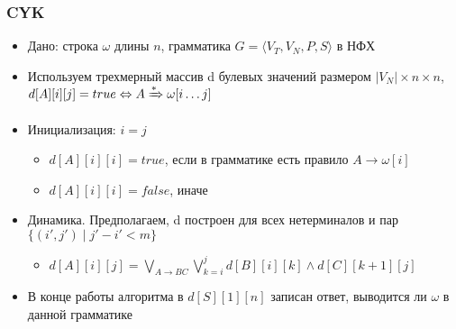 \documentclass{beamer}
\newcommand{\derives}[1][*]{\xRightarrow[]{#1}}
\begin{document}
\begin{frame}[fragile]
  \transwipe[direction=90]
  \frametitle{CYK}
  \begin{itemize}
      \item Дано: строка $\omega$ длины $n$, грамматика $G = \langle V_T, V_N, P, S\rangle$ в НФХ
      \item Используем трехмерный массив d булевых значений размером $|V_N| \times n \times n$, $d[A][i][j] = true \Leftrightarrow A \derives \omega[i \dots j]$
      \item Инициализация: $i = j$
      \begin{itemize}
        \item $d[A][i][i] = true$, если в грамматике есть правило $A \to \omega[i]$
        \item $d[A][i][i] = false$, иначе
      \end{itemize}
      \item Динамика. Предполагаем, d построен для всех нетерминалов и пар $\{(i', j') \mid j' - i' < m \}$
      \begin{itemize}
        \item $d[A][i][j] = \bigvee_{A\to BC}^{}{\bigvee_{k=i}^{j}{d[B][i][k] \wedge d[C][k+1][j]}}$
      \end{itemize}
      \item В конце работы алгоритма в $d[S][1][n]$ записан ответ, выводится ли $\omega$ в данной грамматике
  \end{itemize}
\end{frame}

 
\end{document}
